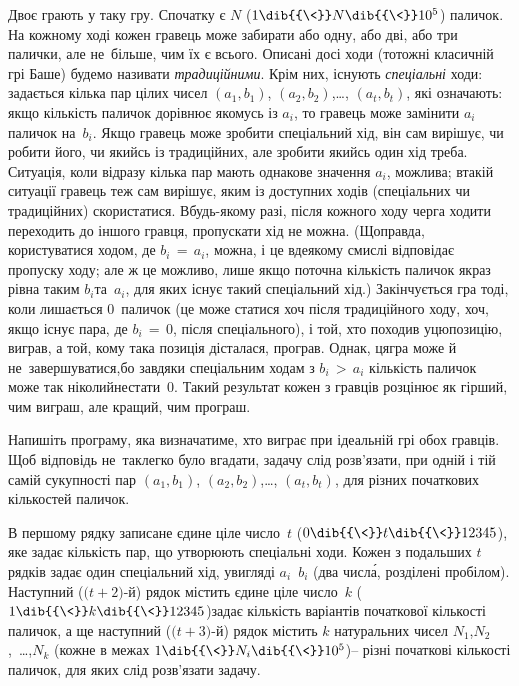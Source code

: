 
Двоє грають у таку гру. Спочатку є $N$ ($1\dib{{\<}}N\dib{{\<}}10^5$) паличок. На кожному ході кожен гравець може забирати або одну, або дві, або три палички, але не~більше, чим їх є всього. Описані досі ходи (тотожні класичній 
грі Баше) 
будемо називати \emph{традиційними}. Крім них, існують \emph{спеціальні} ходи: задається кілька пар цілих чисел 
$(a_1, b_1)$,
$(a_2, b_2)$,\nolinebreak[3] \dots,
$(a_t, b_t)$,
які означають:
якщо кількість паличок дорівнює якомусь із $a_i$, то гравець може замінити $a_i$ паличок на~$b_i$. Якщо гравець може зробити спеціальний хід, він сам вирішує, чи робити його, чи якийсь із традиційних, але зробити якийсь один хід треба. Ситуація, коли відразу кілька пар мають однакове значення $a_i$, можлива; в\nolinebreak[3] такій ситуації гравець теж сам вирішує, яким із доступних ходів (спеціальних чи традиційних) скористатися. В\nolinebreak[3] будь-якому разі, після кожного ходу черга ходити переходить до іншого гравця, пропускати хід не можна. (Щоправда, користуватися ходом, де ${b_i\,{=}\,a_i}$, можна, і це в\nolinebreak[3] деякому смислі відповідає пропуску ходу; але ж це можливо, лише якщо поточна кількість паличок якраз рівна таким $b_i$\nolinebreak[3] та~$a_i$, для яких існує такий спеціальний хід.) Закінчується гра тоді, коли лишається 0~паличок (це може статися хоч після традиційного ходу, хоч, якщо існує пара, де ${b_i\,{=}\,0}$, після спеціального), і той, хто походив у\nolinebreak[3] цю\nolinebreak[3] позицію, виграв, а той, кому така позиція дісталася, програв. Однак, ця\nolinebreak[3] гра може й не~завершуватися,\linebreak[2] бо завдяки спеціальним ходам з ${b_i\,{>}\,a_i}$ кількість паличок може так ніколи\nolinebreak[2] й\nolinebreak[2] не\nolinebreak[3] стати~0. Такий результат кожен з гравців розцінює як гірший, чим виграш, але кращий, чим програш. 

Напишіть програму, яка визначатиме, хто виграє при ідеальній грі обох гравців. Щоб відповідь не~так\nolinebreak[3] легко було вгадати, задачу слід розв'язати, при одній і тій самій сукупності пар 
$(a_1, b_1)$,
$(a_2, b_2)$,\nolinebreak[3] \dots,
$(a_t, b_t)$,
для різних початкових кількостей паличок.

\InputFile
В першому рядку записане єдине ціле число~$t$
($0\dib{{\<}}t\dib{{\<}}12345$), 
яке задає кількість пар, що утворюють спеціальні ходи. Кожен з подальших $t$ рядків задає один спеціальний хід, у\nolinebreak[3] вигляді $a_i$~$b_i$ (два числ\'{а}, розділені пробілом). Наступний (\mbox{${(t{+}2})$-й}) рядок містить єдине ціле число~$k$
($1\dib{{\<}}k\dib{{\<}}12345$)\nolinebreak[3] задає кількість варіантів початкової кількості паличок, а ще наступний (\mbox{${(t{+}3})$-й}) рядок містить $k$ натуральних чисел $N_1$,\nolinebreak[3] $N_2$,~…,\nolinebreak[3] $N_k$ (кожне в межах $1\dib{{\<}}N_i\dib{{\<}}10^5$)\nolinebreak[3] – різні початкові кількості паличок, для яких слід розв'язати задачу. 


